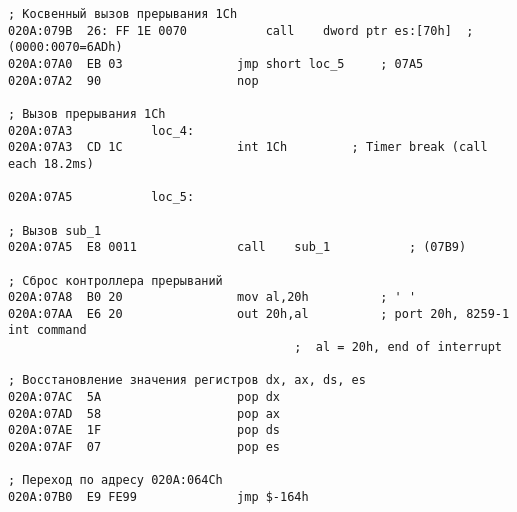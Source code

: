 \begin{center}
\begin{lstlisting}[style={asm}, caption = Прерывание int 8h]
; Косвенный вызов прерывания 1Ch
020A:079B  26: FF 1E 0070			call	dword ptr es:[70h]	; (0000:0070=6ADh)
020A:07A0  EB 03				jmp	short loc_5		; 07A5
020A:07A2  90					nop

; Вызов прерывания 1Ch
020A:07A3			loc_4:
020A:07A3  CD 1C				int	1Ch			; Timer break (call each 18.2ms)

020A:07A5			loc_5:

; Вызов sub_1
020A:07A5  E8 0011				call	sub_1			; (07B9)

; Сброс контроллера прерываний
020A:07A8  B0 20				mov	al,20h			; ' '
020A:07AA  E6 20				out	20h,al			; port 20h, 8259-1 int command
										;  al = 20h, end of interrupt
										
; Восстановление значения регистров dx, ax, ds, es
020A:07AC  5A					pop	dx
020A:07AD  58					pop	ax
020A:07AE  1F					pop	ds
020A:07AF  07					pop	es

; Переход по адресу 020A:064Ch
020A:07B0  E9 FE99				jmp	$-164h
\end{lstlisting}

\end{center}